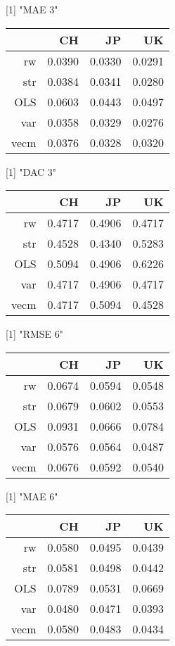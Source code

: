 [1] "MAE 3"
\begin{table}[ht]
\centering
\begin{tabular}{rrrr}
  \hline
 & CH & JP & UK \\ 
  \hline
rw & 0.0390 & 0.0330 & 0.0291 \\ 
  str & 0.0384 & 0.0341 & 0.0280 \\ 
  OLS & 0.0603 & 0.0443 & 0.0497 \\ 
  var & 0.0358 & 0.0329 & 0.0276 \\ 
  vecm & 0.0376 & 0.0328 & 0.0320 \\ 
   \hline
\end{tabular}
\end{table}
[1] "DAC 3"
\begin{table}[ht]
\centering
\begin{tabular}{rrrr}
  \hline
 & CH & JP & UK \\ 
  \hline
rw & 0.4717 & 0.4906 & 0.4717 \\ 
  str & 0.4528 & 0.4340 & 0.5283 \\ 
  OLS & 0.5094 & 0.4906 & 0.6226 \\ 
  var & 0.4717 & 0.4906 & 0.4717 \\ 
  vecm & 0.4717 & 0.5094 & 0.4528 \\ 
   \hline
\end{tabular}
\end{table}
[1] "RMSE 6"
\begin{table}[ht]
\centering
\begin{tabular}{rrrr}
  \hline
 & CH & JP & UK \\ 
  \hline
rw & 0.0674 & 0.0594 & 0.0548 \\ 
  str & 0.0679 & 0.0602 & 0.0553 \\ 
  OLS & 0.0931 & 0.0666 & 0.0784 \\ 
  var & 0.0576 & 0.0564 & 0.0487 \\ 
  vecm & 0.0676 & 0.0592 & 0.0540 \\ 
   \hline
\end{tabular}
\end{table}
[1] "MAE 6"
\begin{table}[ht]
\centering
\begin{tabular}{rrrr}
  \hline
 & CH & JP & UK \\ 
  \hline
rw & 0.0580 & 0.0495 & 0.0439 \\ 
  str & 0.0581 & 0.0498 & 0.0442 \\ 
  OLS & 0.0789 & 0.0531 & 0.0669 \\ 
  var & 0.0480 & 0.0471 & 0.0393 \\ 
  vecm & 0.0580 & 0.0483 & 0.0434 \\ 
   \hline
\end{tabular}
\end{table}

